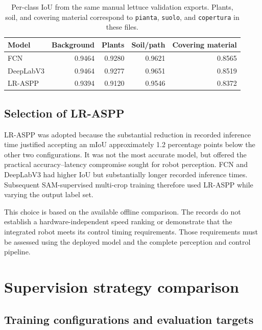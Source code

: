 \begin{table}[htbp]
    \centering
    \small
    \caption{Per-class IoU from the same manual lettuce validation
    exports. Plants, soil, and covering material correspond to
    \texttt{pianta}, \texttt{suolo}, and \texttt{copertura} in these files.}
    \label{tab:c4_architecture_class_iou}
    \begin{tabular}{@{}l r r r r@{}}
        \toprule
        Model & Background & Plants & Soil/path & Covering material \\
        \midrule
        FCN & 0.9464 & 0.9280 & 0.9621 & 0.8565 \\
        DeepLabV3 & 0.9464 & 0.9277 & 0.9651 & 0.8519 \\
        LR-ASPP & 0.9394 & 0.9120 & 0.9546 & 0.8372 \\
        \bottomrule
    \end{tabular}
\end{table}

\subsection{Selection of LR-ASPP}
\label{subsec:c4_lraspp_selection}

LR-ASPP was adopted because the substantial reduction in recorded
inference time justified accepting an mIoU approximately 1.2 percentage
points below the other two configurations. It was not the most accurate
model, but offered the practical accuracy--latency compromise sought for
robot perception. FCN and DeepLabV3 had higher IoU but substantially
longer recorded inference times. Subsequent SAM-supervised multi-crop
training therefore used LR-ASPP while varying the output label set.

This choice is based on the available offline comparison. The records
do not establish a hardware-independent speed ranking or demonstrate
that the integrated robot meets its control timing requirements.
Those requirements must be assessed using the deployed model and the
complete perception and control pipeline.

\section{Supervision strategy comparison}
\label{sec:c4_supervision_comparison}

\subsection{Training configurations and evaluation targets}
\label{subsec:c4_supervision_configurations}

